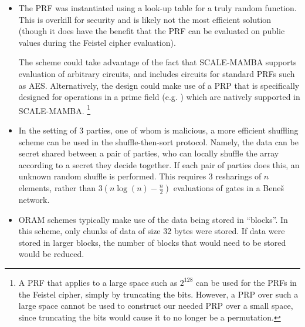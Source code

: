 \begin{itemize}

\item
The PRF was instantiated using a look-up table for a truly random function.
This is overkill for security and is likely not the most efficient solution
(though it does have the benefit that the PRF can be evaluated on 
public values during the Feistel cipher evaluation).

The scheme could take advantage of the fact that SCALE-MAMBA supports
evaluation of arbitrary circuits, and includes circuits for 
standard PRFs such as AES. 
Alternatively, the design could make use of a PRP that is specifically
designed for operations in a prime field (e.g. \cite{albrecht2016mimc})
which are natively supported in SCALE-MAMBA.
\footnote{
A PRF that applies to a large space such as $2^{128}$
can be used for the PRFs in the Feistel cipher, simply by truncating the bits.
However, a PRP over such a large space cannot be used to 
construct our needed PRP over a small space, since
truncating the bits would cause it to no longer be a permutation.}

\item
In the setting of 3 parties, one of whom is malicious,
a more efficient shuffling scheme can be used in the shuffle-then-sort protocol.
Namely, the data can be secret shared between a pair of parties,
who can locally shuffle the array according to a secret they decide together.
If each pair of parties does this, an unknown random shuffle is performed.
This requires 3 resharings of $n$ elements, rather than 3$(n\log(n) - \frac{n}{2})$
 evaluations of gates in a Bene\v{s} network.

\item
ORAM schemes typically make use of the data being stored in ``blocks''.
In this scheme, only chunks of data of size 32 bytes were stored.
If data were stored in larger blocks, the number of blocks
that would need to be stored would be reduced.


\end{itemize}



